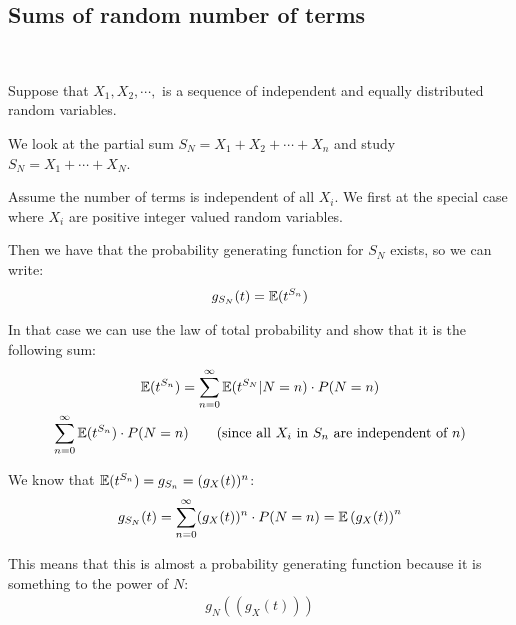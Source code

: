 \subsection{Sums of random number of terms}\hfill\\\par
\noindent Suppose that $X_1,X_2,\cdots,$  is a sequence of independent and equally distributed random variables.\par
\noindent We look at the partial sum $S_N = X_1+X_2+\cdots+X_n$ and study $S_N = X_1+\cdots+X_N$.\par
\noindent Assume the number of terms is independent of all $X_i$. We first at the special case where $X_i$ are positive integer valued random variables.\par
\noindent Then we have that the probability generating function for $S_N$ exists, so we can write:
\begin{equation*}
  \begin{gathered}
    g_{S_N}(t) = \mathbb{E}(t^{S_n})
  \end{gathered}
\end{equation*}\par
\noindent In that case we can use the law of total probability and show that it is the following sum:
\begin{equation*}
  \begin{gathered}
    \mathbb{E}(t^{S_n}) = \sum_{n=0}^{\infty}\mathbb{E}(t^{S_N}|N=n)\cdot P(N=n)\\
    \sum_{n=0}^{\infty}\mathbb{E}(t^{S_n})\cdot P(N=n)\qquad\text{(since all $X_i$ in $S_n$ are independent of $n$)}
  \end{gathered}
\end{equation*}\par
\noindent We know that $\mathbb{E}(t^{S_n}) = g_{S_n} = (g_X(t))^n$:
\begin{equation*}
  \begin{gathered}
    g_{S_N}(t) = \sum_{n=0}^{\infty}(g_X(t))^n\cdot P(N=n) = \mathbb{E}\left(g_X(t)\right)^n
  \end{gathered}
\end{equation*}\par
\noindent This means that this is almost a probability generating function because it is something to the power of $N$:
\begin{equation*}
  \begin{gathered}
    g_N((g_X(t)))
  \end{gathered}
\end{equation*}\par
